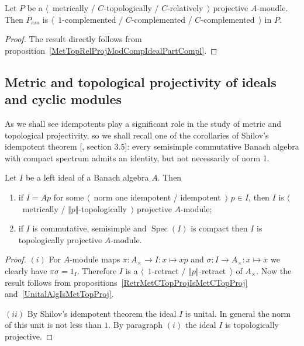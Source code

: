 \begin{corollary}\label{MetTopRelProjModPartCompl} Let $P$ 
be a $\langle$~metrically / $C$-topologically / $C$-relatively~$\rangle$ 
projective $A$-moudle. Then $P_{ess}$ 
is $\langle$~$1$-complemented / $C$-complemented / $C$-complemented~$\rangle$ 
in $P$.
\end{corollary}
\begin{proof} The result directly follows from 
proposition~\ref{MetTopRelProjModCompIdealPartCompl}.
\end{proof}


\subsection{
    Metric and topological projectivity of ideals and cyclic modules
}\label{SubSectionMetricAndTopologicalProjectivityOfIdealsAndCyclicModules}

As we shall see idempotents play a significant role in the study of metric and
topological projectivity, so we shall recall one of the corollaries of Shilov's
idempotent theorem [\cite{KaniBanAlg}, section 3.5]: every semisimple
commutative Banach algebra with compact spectrum admits an identity, but not
necessarily of norm 1. 

\begin{proposition}\label{UnIdeallIsMetTopProj} Let $I$ be a left ideal of a
Banach algebra $A$. Then

\begin{enumerate}[label = (\roman*)]
    \item if $I=Ap$ for some $\langle$~norm one idempotent /
    idempotent~$\rangle$ $p\in I$, then $I$ is $\langle$~metrically / 
    $\Vert p\Vert$-topologically~$\rangle$ projective $A$-module;

    \item if $I$ is commutative, semisimple and $\operatorname{Spec}(I)$ is
    compact then $I$ is topologically projective $A$-module.
\end{enumerate}
\end{proposition}
\begin{proof} 
$(i)$ For $A$-module maps $\pi:A_\times\to I:x\mapsto xp$ and 
$\sigma:I\to A_\times:x\mapsto x$ we clearly have $\pi\sigma=1_I$. 
Therefore $I$ is a $\langle$~$1$-retract / $\Vert p\Vert$-retract~$\rangle$ 
of $A_\times$. Now the result follows from 
propositions~\ref{RetrMetCTopProjIsMetCTopProj} and~\ref{UnitalAlgIsMetTopProj}.

$(ii)$ By Shilov's idempotent theorem the ideal $I$ is unital. In general the
norm of this unit is not less than $1$. By paragraph $(i)$ the ideal $I$ is
topologically projective.
\end{proof}

